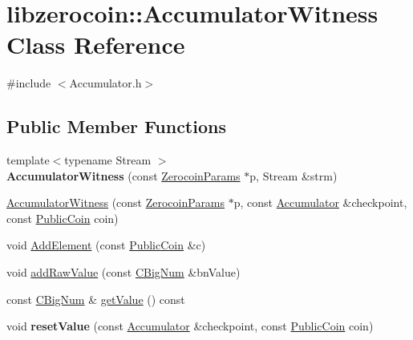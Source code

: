 \hypertarget{classlibzerocoin_1_1_accumulator_witness}{}\section{libzerocoin\+::Accumulator\+Witness Class Reference}
\label{classlibzerocoin_1_1_accumulator_witness}


{\ttfamily \#include $<$Accumulator.\+h$>$}

\subsection*{Public Member Functions}
\begin{DoxyCompactItemize}
\item 
\mbox{\label{classlibzerocoin_1_1_accumulator_witness_a98162d6119fe9aa6399df99aac06d159}} 
{\footnotesize template$<$typename Stream $>$ }\\{\bfseries Accumulator\+Witness} (const \mbox{\hyperlink{classlibzerocoin_1_1_zerocoin_params}{Zerocoin\+Params}} $\ast$p, Stream \&strm)
\item 
\mbox{\hyperlink{classlibzerocoin_1_1_accumulator_witness_af1abca6db569d151f4b416221f28d18e}{Accumulator\+Witness}} (const \mbox{\hyperlink{classlibzerocoin_1_1_zerocoin_params}{Zerocoin\+Params}} $\ast$p, const \mbox{\hyperlink{classlibzerocoin_1_1_accumulator}{Accumulator}} \&checkpoint, const \mbox{\hyperlink{classlibzerocoin_1_1_public_coin}{Public\+Coin}} coin)
\item 
void \mbox{\hyperlink{classlibzerocoin_1_1_accumulator_witness_aa567ece888a3b06498b668ed3f613bdb}{Add\+Element}} (const \mbox{\hyperlink{classlibzerocoin_1_1_public_coin}{Public\+Coin}} \&c)
\item 
void \mbox{\hyperlink{classlibzerocoin_1_1_accumulator_witness_a7c5b47a42f8a2c51f7c7f64ff0809f7d}{add\+Raw\+Value}} (const \mbox{\hyperlink{class_c_big_num}{C\+Big\+Num}} \&bn\+Value)
\item 
const \mbox{\hyperlink{class_c_big_num}{C\+Big\+Num}} \& \mbox{\hyperlink{classlibzerocoin_1_1_accumulator_witness_af0afa4225f01cd21bdc8e88e310a0168}{get\+Value}} () const
\item 
\mbox{\label{classlibzerocoin_1_1_accumulator_witness_a6edd0f05c65891cc10a58e5cd7eaf277}} 
void {\bfseries reset\+Value} (const \mbox{\hyperlink{classlibzerocoin_1_1_accumulator}{Accumulator}} \&checkpoint, const \mbox{\hyperlink{classlibzerocoin_1_1_public_coin}{Public\+Coin}} coin)

\end{DoxyCompactItemize}
